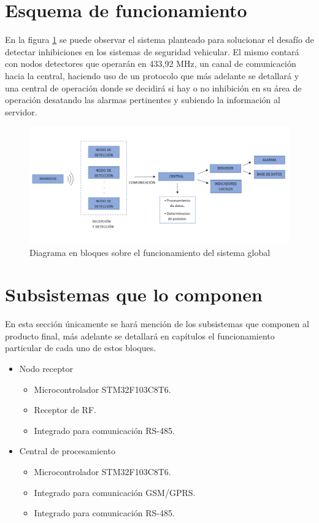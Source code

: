 \section{Esquema de funcionamiento}

En la figura \ref{bloques_funcionamiento} se puede observar el sistema planteado para solucionar el desafío de detectar inhibiciones en los sistemas
de seguridad vehicular. El mismo contará con nodos detectores que operarán en 433,92 MHz, un canal de comunicación hacia la central, haciendo
uso de un protocolo que más adelante se detallará y una central de operación donde se decidirá si hay o no inhibición en su área de operación
desatando las alarmas pertinentes y subiendo la información al servidor. \par

\begin{figure}[htb]
	\centering
	\includegraphics[scale=0.53]{images/bloques_funcionamiento.png}
    \caption{Diagrama en bloques sobre el funcionamiento del sistema global}
	\label{bloques_funcionamiento}
\end{figure}

\section{Subsistemas que lo componen}

En esta sección únicamente se hará mención de los subsistemas que componen al producto final, más adelante se detallará en capítulos el funcionamiento 
particular de cada uno de estos bloques.

\begin{itemize}
    \item Nodo receptor 
    \begin{itemize}
          \item Microcontrolador STM32F103C8T6.
          \item Receptor de RF. 
          \item Integrado para comunicación RS-485.
    \end{itemize}
    \item Central de procesamiento 
    \begin{itemize}
          \item Microcontrolador STM32F103C8T6.
          \item Integrado para comunicación GSM/GPRS. 
          \item Integrado para comunicación RS-485.
    \end{itemize}
    
\end{itemize}
